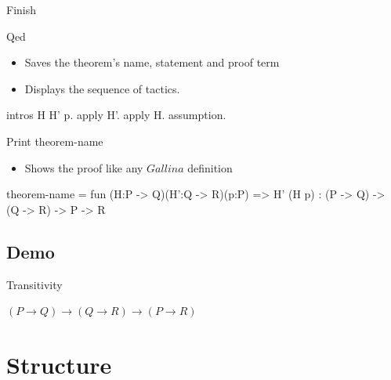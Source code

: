 \begin{frame}[fragile]{Finish}
	\begin{user}
	Qed
	\end{user}
	\pause
	\begin{itemize}
		\item Saves the theorem's name, statement and proof term
		\pause
		\item Displays the sequence of tactics.
	\end{itemize}
	\begin{coq}
	intros H H' p.
	apply H'.
	apply H.
	assumption.
	\end{coq}
	\pause
	\medskip
	\begin{user}
	Print theorem-name
	\end{user}
	\pause
	\begin{itemize}
		\item Shows the proof like any $Gallina$ definition
	\end{itemize}
	\begin{coq}
	theorem-name = fun (H:P -> Q)(H':Q -> R)(p:P) => H' (H p)
		 : (P -> Q) -> (Q -> R) -> P -> R
	\end{coq}
\end{frame}

\subsection{Demo}
\begin{frame}{Transitivity}
	\begin{center}
		$(P \rightarrow Q) \rightarrow (Q \rightarrow R) \rightarrow (P \rightarrow R)$
	\end{center}
\end{frame}

\section{Structure}

